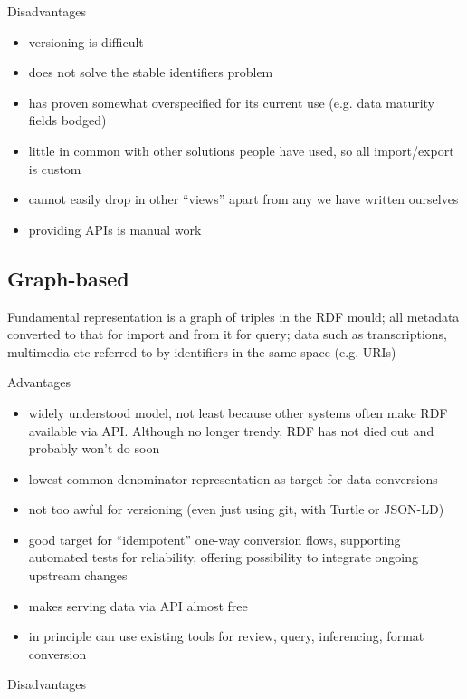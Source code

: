 \documentclass[sigconf, nonacm=true]{acmart}
\begin{document}
\begin{sloppypar}
  Disadvantages

  \begin{itemize}
  \item versioning is difficult
  \item does not solve the stable identifiers problem
  \item has proven somewhat overspecified for its current use
    (e.g. data maturity fields bodged)
  \item little in common with other solutions people have used, so all
    import/export is custom
  \item cannot easily drop in other ``views'' apart from any we have
    written ourselves
  \item providing APIs is manual work
  \end{itemize}

  \subsection{Graph-based}

  Fundamental representation is a graph of triples in the RDF mould;
  all metadata converted to that for import and from it for query;
  data such as transcriptions, multimedia etc referred to by
  identifiers in the same space (e.g. URIs)

  Advantages

  \begin{itemize}
    \item widely understood model, not least because other systems
      often make RDF available via API. Although no longer trendy, RDF
      has not died out and probably won't do soon
    \item lowest-common-denominator representation as target for data
      conversions
    \item not too awful for versioning (even just using git, with
      Turtle or JSON-LD)
    \item good target for ``idempotent'' one-way conversion flows,
      supporting automated tests for reliability, offering possibility
      to integrate ongoing upstream changes
    \item makes serving data via API almost free
    \item in principle can use existing tools for review, query,
      inferencing, format conversion
  \end{itemize}

  Disadvantages


\end{sloppypar}
\end{document}
